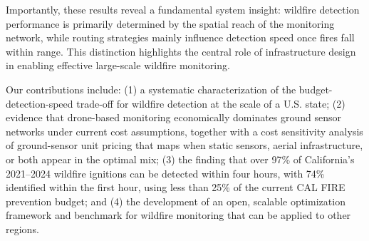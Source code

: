 \documentclass[pdflatex,sn-mathphys-num]{sn-jnl}%
\theoremstyle{thmstyleone}%
\theoremstyle{thmstyletwo}%
\theoremstyle{thmstylethree}%
\begin{document}
Importantly, these results reveal a fundamental system insight: wildfire detection performance is primarily determined by the spatial reach of the monitoring network, while routing strategies mainly influence detection speed once fires fall within range. This distinction highlights the central role of infrastructure design in enabling effective large-scale wildfire monitoring.



Our contributions include: (1) a systematic characterization of the budget-detection-speed trade-off for wildfire detection at the scale of a U.S. state; (2) evidence that drone-based monitoring economically dominates ground sensor networks under current cost assumptions, together with a cost sensitivity analysis of ground-sensor unit pricing that maps when static sensors, aerial infrastructure, or both appear in the optimal mix; (3) the finding that over 97\% of California's 2021--2024 wildfire ignitions can be detected within four hours, with 74\% identified within the first hour, using less than 25\% of the current CAL FIRE prevention budget; and (4) the development of an open, scalable optimization framework and benchmark for wildfire monitoring that can be applied to other regions.
\end{document}
